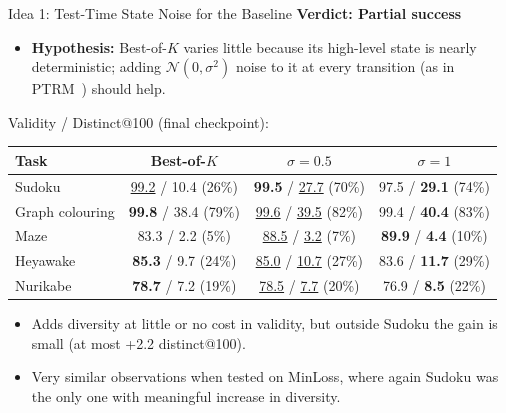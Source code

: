 \documentclass[aspectratio=169,10pt]{beamer}
\newcommand{\secbest}[1]{\underline{#1}}
\newcommand{\verdictpartial}{\textcolor{accentamber}{\textbf{Verdict: Partial success}}}
\newcommand{\Bok}{Best-of-$K$}
\begin{document}
\begin{frame}{Idea 1: Test-Time State Noise for the Baseline}
  \verdictpartial
  \vspace{0.3em}
  \begin{itemize}\setlength{\itemsep}{0.3em}
    \item \textbf{Hypothesis:} \Bok{} varies little because its high-level state is nearly deterministic; adding $\mathcal{N}(0,\sigma^2)$ noise to it at every transition (as in PTRM~\cite{sghaier2026}) should help.
  \end{itemize}
  \vspace{0.3em}
  \centering
  \footnotesize
  Validity / Distinct@100 (final checkpoint):\\[0.25em]
  \begin{tabular}{@{}lccc@{}}
    \toprule
    \textbf{Task} & \textbf{\Bok{}} & \textbf{$\sigma = 0.5$} & \textbf{$\sigma = 1$} \\
    \midrule
    Sudoku & \secbest{99.2} / 10.4 (26\%) & \textbf{99.5} / \secbest{27.7} (70\%) & 97.5 / \textbf{29.1} (74\%) \\
    Graph colouring & \textbf{99.8} / 38.4 (79\%) & \secbest{99.6} / \secbest{39.5} (82\%) & 99.4 / \textbf{40.4} (83\%) \\
    Maze & 83.3 / 2.2 (5\%) & \secbest{88.5} / \secbest{3.2} (7\%) & \textbf{89.9} / \textbf{4.4} (10\%) \\
    Heyawake & \textbf{85.3} / 9.7 (24\%) & \secbest{85.0} / \secbest{10.7} (27\%) & 83.6 / \textbf{11.7} (29\%) \\
    Nurikabe & \textbf{78.7} / 7.2 (19\%) & \secbest{78.5} / \secbest{7.7} (20\%) & 76.9 / \textbf{8.5} (22\%) \\
    \bottomrule
  \end{tabular}

  \vspace{0.5em}
  \raggedright\small
  \begin{itemize}\setlength{\itemsep}{0.3em}
    \item Adds diversity at little or no cost in validity, but outside Sudoku the gain is small (at most +2.2 distinct@100).
    \item Very similar observations when tested on MinLoss, where again Sudoku was the only one with meaningful increase in diversity.
  \end{itemize}
\end{frame}


\end{document}
